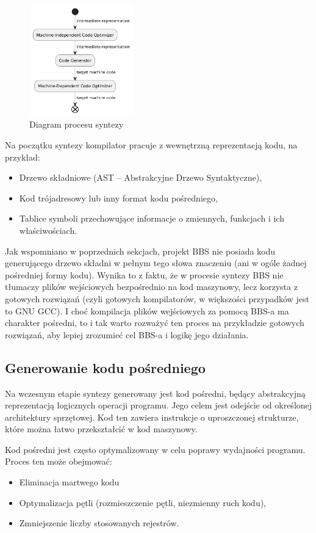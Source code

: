 \begin{figure}[h]
    \centering
    \includegraphics[width=0.4\textwidth]{Images/synthesis.png}
    \caption{Diagram procesu syntezy}
\end{figure}

Na początku syntezy kompilator pracuje z wewnętrzną reprezentacją kodu, na przykład:
\begin{itemize}
    \item Drzewo składniowe (AST -- Abstrakcyjne Drzewo Syntaktyczne),
    \item Kod trójadresowy lub inny format kodu pośredniego,
    \item Tablice symboli przechowujące informacje o zmiennych, funkcjach i ich właściwościach.
\end{itemize}

Jak wspomniano w poprzednich sekcjach, projekt BBS nie posiada kodu generującego drzewo składni w pełnym tego słowa znaczeniu (ani w ogóle żadnej pośredniej formy kodu). Wynika to z faktu, że w procesie syntezy BBS nie tłumaczy plików wejściowych bezpośrednio na kod maszynowy, lecz korzysta z gotowych rozwiązań (czyli gotowych kompilatorów, w większości przypadków jest to GNU GCC). I choć kompilacja plików wejściowych za pomocą BBS-a ma charakter pośredni, to i tak warto rozważyć ten proces na przykładzie gotowych rozwiązań, aby lepiej zrozumieć cel BBS-a i logikę jego działania.

\subsection{Generowanie kodu pośredniego}
Na wczesnym etapie syntezy generowany jest kod pośredni, będący abstrakcyjną reprezentacją logicznych operacji programu. Jego celem jest odejście od określonej architektury sprzętowej. Kod ten zawiera instrukcje o uproszczonej strukturze, które można łatwo przekształcić w kod maszynowy.

Kod pośredni jest często optymalizowany w celu poprawy wydajności programu. Proces ten może obejmować:
\begin{itemize}
    \item Eliminacja martwego kodu
    \item Optymalizacja pętli (rozmieszczenie pętli, niezmienny ruch kodu),
    \item Zmniejszenie liczby stosowanych rejestrów.
\end{itemize}

